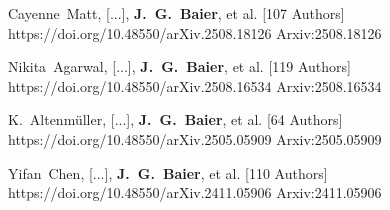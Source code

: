          {Cayenne~{Matt}, [...], \textbf{J.~G.~{Baier}}, et al. [107 Authors]}
         {https://doi.org/10.48550/arXiv.2508.18126}
         {{Arxiv:}2508.18126}

         {Nikita~{Agarwal}, [...], \textbf{J.~G.~{Baier}}, et al. [119 Authors]}
         {https://doi.org/10.48550/arXiv.2508.16534}
         {{Arxiv:}2508.16534}

         {K.~{Altenm{\"u}ller}, [...], \textbf{J.~G.~{Baier}}, et al. [64 Authors]}
         {https://doi.org/10.48550/arXiv.2505.05909}
         {{Arxiv:}2505.05909}

         {Yifan~{Chen}, [...], \textbf{J.~G.~{Baier}}, et al. [110 Authors]}
         {https://doi.org/10.48550/arXiv.2411.05906}
         {{Arxiv:}2411.05906}

